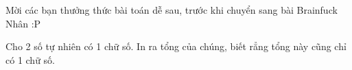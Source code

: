 Mời các bạn thưởng thức bài toán dễ sau, trước khi chuyển sang bài Brainfuck Nhân :P  

   Cho 2 số tự nhiên có 1 chữ số. In ra tổng của chúng, biết rẳng tổng này cũng chỉ có 1 chữ số.  

\